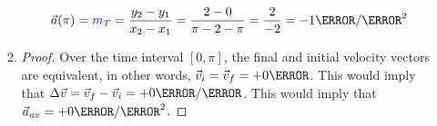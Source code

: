 \documentclass[12pt]{article} %
\begin{document}
\begin{qstn}[4]
\begin{enumerate}[label = (\alph*)]
\begin{soln}
\begin{enumerate}[label = (\alph*)]
            $$\vec a(\pi) = \textcolor{blue}{m_T} = \frac{y_2 - y_1}{x_2 - x_1} = \frac{2 - 0}{\pi - 2 - \pi} = \frac{2}{-2} = -1 \m / \s^2$$

            \item 
            \begin{proof}
                Over the time interval $[0,\pi]$, the final and initial velocity vectors are equivalent, in other words, $\vec v_i = \vec v_f = +0\m$. This would imply that $\Delta \vec v = \vec v_f - \vec v_i = +0\m / \s$. This would imply that $\vec a_{av} = +0\m / \s^2$.
            \end{proof}
            
            \end{enumerate}
        \end{soln}


    \end{enumerate}


 \end{qstn}
\end{document}
